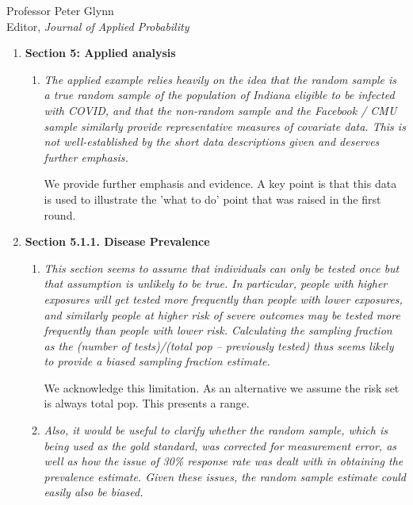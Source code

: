 \documentclass[11pt]{letter} %
\begin{document}
\begin{letter}{Professor
	Peter Glynn\\
	Editor, {\em Journal of Applied Probability}}
\begin{enumerate}
\begin{enumerate}
	We clarify this notation in Section 4.2.  Specifically, the SEIR model is used to generate the number of new weekly cases which allows us to calculate the number of individuals with an active infection within each strata (i.e.~$I_{k,t}$ for the $k$th strata).  We then can use this to estimate the active infection rate per strata,~$\mu_k$.
	\textcolor{red}{Need To Do.}
	\vspace{5mm}
\end{enumerate}
\item {\bf Section 5: Applied analysis}
\begin{enumerate}
	\item {\it The applied example relies heavily on the idea that the random sample is a true random sample of the population of Indiana eligible to be infected with COVID, and that the non-random sample and the Facebook / CMU sample similarly provide representative measures of covariate data. This is not well-established by the short data descriptions given and deserves further emphasis.}
	\vspace{5mm}

	We provide further emphasis and evidence.  A key point is that this data is used to illustrate the 'what to do' point that was raised in the first round.
	\vspace{5mm}
\end{enumerate}
\item {\bf Section 5.1.1. Disease Prevalence}
\begin{enumerate}
	\item {\it This section seems to assume that individuals can only be tested once but that assumption is unlikely to be true. In particular, people with higher exposures will get tested more frequently than people with lower exposures, and similarly people at higher risk of severe outcomes may be tested more frequently than people with lower risk. Calculating the sampling fraction as the (number of tests)/(total pop – previously tested) thus seems likely to provide a biased sampling fraction estimate.}
	\vspace{5mm}

	We acknowledge this limitation.  As an alternative we assume the risk set is always total pop.  This presents a range.
	\vspace{5mm}
	\item {\it Also, it would be useful to clarify whether the random sample, which is being used as the gold standard, was corrected for measurement error, as well as how the issue of 30\% response rate was dealt with in obtaining the prevalence estimate. Given these issues, the random sample estimate could easily also be biased.}
	\vspace{5mm}


\end{enumerate}
\end{enumerate}
\end{letter}
\end{document}
